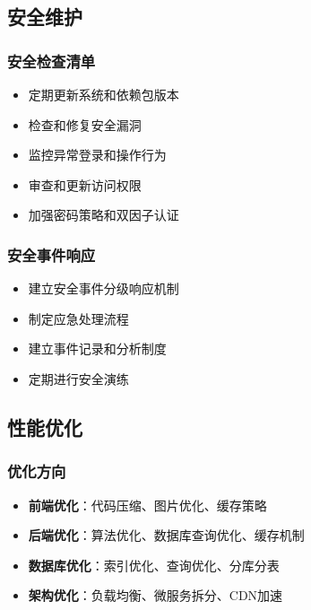 \documentclass[a4paper]{article}
\begin{document}
\subsection{安全维护}

\subsubsection{安全检查清单}

\begin{itemize}
    \item 定期更新系统和依赖包版本
    \item 检查和修复安全漏洞
    \item 监控异常登录和操作行为
    \item 审查和更新访问权限
    \item 加强密码策略和双因子认证
\end{itemize}

\subsubsection{安全事件响应}

\begin{itemize}
    \item 建立安全事件分级响应机制
    \item 制定应急处理流程
    \item 建立事件记录和分析制度
    \item 定期进行安全演练
\end{itemize}

\subsection{性能优化}

\subsubsection{优化方向}

\begin{itemize}
    \item \textbf{前端优化}：代码压缩、图片优化、缓存策略
    \item \textbf{后端优化}：算法优化、数据库查询优化、缓存机制
    \item \textbf{数据库优化}：索引优化、查询优化、分库分表
    \item \textbf{架构优化}：负载均衡、微服务拆分、CDN加速
\end{itemize}
\end{document}
